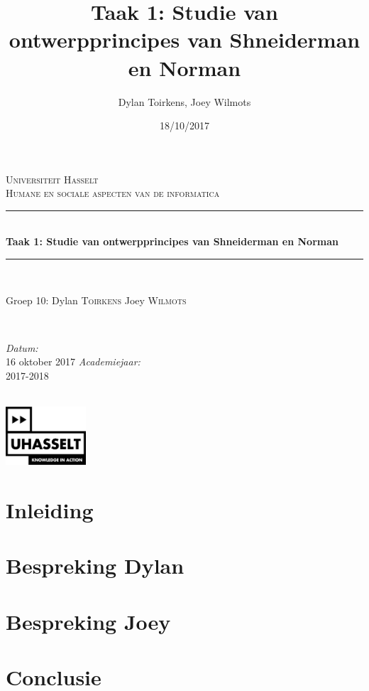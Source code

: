 \documentclass[12pt]{article}
\author{Dylan Toirkens, Joey Wilmots}
\title{\textbf{Taak 1: Studie van ontwerpprincipes van Shneiderman en Norman}}
\date{18/10/2017}
\begin{document}
	\begin{titlepage}
		
		\newcommand{\HRule}{\rule{\linewidth}{0.5mm}} %
		
		\begin{center} %
			
			\textsc{\LARGE Universiteit Hasselt}\\[1.5cm] %
			\textsc{\Large Humane en sociale aspecten van de informatica}\\[0.5cm] %
			
			\HRule \\[0.4cm]
			{ \huge \bfseries Taak 1: Studie van ontwerpprincipes van Shneiderman en Norman}\\[0.4cm]
			\HRule \\[1.5cm]
			
			\begin{minipage}{0.5\textwidth}
				\begin{flushleft} \large
					Groep 10:\newline
					Dylan \textsc{Toirkens}\newline
					Joey \textsc{Wilmots}
				\end{flushleft}
			\end{minipage}
			~
			\begin{minipage}{0.3\textwidth}
				\begin{flushright} \large
					\emph{Datum:}\\
					16 oktober 2017
					\emph{Academiejaar: } \\
					2017-2018
				\end{flushright}
			\end{minipage}\\[3cm]
			\vspace{25 mm}
			\includegraphics[width=3.0cm]{UHasselt-logo.jpg}\\[2.0cm]  
		\end{center}
	\end{titlepage}
\newpage
\tableofcontents
\clearpage

\section{Inleiding}

\section{Bespreking Dylan}

\section{Bespreking Joey}

\section{Conclusie}
\end{document}
